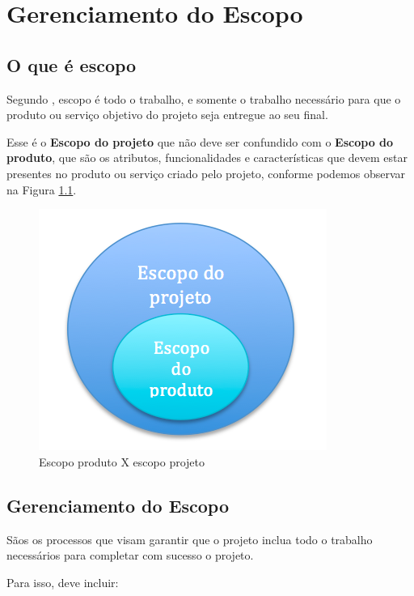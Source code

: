 
\chapter{Gerenciamento do Escopo}

\section{O que é escopo}

Segundo \cite{pmbok}, escopo  é  todo  o  trabalho,  e  somente  o  trabalho  necessário  para  que  o  produto  ou 
serviço objetivo do projeto seja entregue ao seu final.

Esse é o \textbf{Escopo do projeto} que não deve ser confundido com o \textbf{Escopo do produto}, que são os atributos, funcionalidades e características que devem estar presentes no produto ou serviço criado pelo projeto, conforme podemos observar na Figura \ref{fig:escopo:proj:prod}.

\begin{figure}[!h]
\centering
\includegraphics[scale=0.5]{Figuras/escopo_proj_prod.png}
\caption{Escopo produto X escopo projeto}
\label{fig:escopo:proj:prod}
\end{figure}

\section{Gerenciamento do Escopo}

Sãos os processos que visam garantir que o projeto inclua todo o trabalho necessários para completar com sucesso o projeto.

Para isso, deve incluir:

